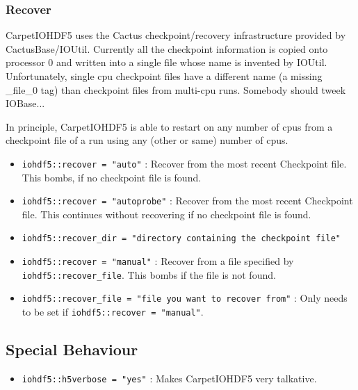 \subsubsection{Recover}

CarpetIOHDF5 uses the Cactus checkpoint/recovery infrastructure provided by
CactusBase/IOUtil. Currently all the checkpoint information is copied onto processor 0 and
 written into a single file whose name is invented by IOUtil. Unfortunately, single cpu
checkpoint files have a different name (a missing \_file\_0 tag) than checkpoint
files from multi-cpu runs. Somebody should tweek IOBase... 

In principle, CarpetIOHDF5 is able to restart on any number
of cpus  from a checkpoint file of a run using any (other or same) number of cpus.

\begin{itemize}
  \item {\tt iohdf5::recover = "auto"} : Recover from the most recent Checkpoint file. This bombs,
    if no checkpoint file is found.
  \item {\tt iohdf5::recover = "autoprobe"} : Recover from the most recent Checkpoint file. This continues
    without recovering if no checkpoint file is found.
  \item {\tt iohdf5::recover\_dir = "directory containing the checkpoint file"} 
  \item {\tt iohdf5::recover = "manual"} : Recover from a file specified by {\tt iohdf5::recover\_file}. This
     bombs if the file is not found.
  \item {\tt iohdf5::recover\_file = "file you want to recover from"} : Only needs to be set if
    {\tt iohdf5::recover = "manual"}.

\end{itemize}



\subsection{Special Behaviour}

\begin{itemize}
  \item {\tt iohdf5::h5verbose = "yes"} : Makes CarpetIOHDF5 very talkative.
\end{itemize}


